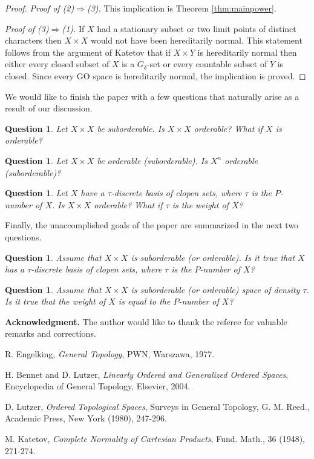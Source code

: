 \documentclass[12pt]{amsart}
\newtheorem{que}[thm]{Question}
\begin{document}
\begin{proof}
\par\bigskip\noindent
{\it Proof of (2)$\Rightarrow$(3).} This implication is Theorem \ref{thm:mainpower}.

\par\bigskip\noindent
{\it Proof of (3)$\Rightarrow$(1).}  If $X$ had a stationary subset or  two limit points of distinct characters then $X\times X$ would not have been hereditarily normal. This statement follows from the argument of Katetov \cite{Kat} that if $X\times Y$ is hereditarily normal then either  every closed subset of $X$ is a $G_\delta$-set or every countable subset of $Y$ is closed. Since every GO space is hereditarily normal, the implication is proved.
\end{proof}
\par\bigskip
We would like to finish the paper with a few questions that naturally arise as a result of our discussion.
\par\bigskip\noindent
\begin{que}
Let $X\times X$ be suborderable. Is $X\times X$ orderable? What if $X$ is orderable?
\end{que}
\begin{que}
Let $X\times X$ be orderable (suborderable). Is $X^n$ orderable (suborderable)?
\end{que}
\begin{que}
Let $X$ have a $\tau$-discrete basis of clopen sets, where $\tau$ is the $P$-number of $X$. Is $X\times X$ orderable?
What if $\tau$ is the weight of $X$?
\end{que}
\par\bigskip\noindent
Finally, the unaccomplished goals of the paper are summarized in the next two questions.
\begin{que}
Assume that $X\times X$ is suborderable (or orderable). Is it true that $X$ has a $\tau$-discrete basis of clopen sets, where $\tau$ is the $P$-number of $X$?
\end{que}
\begin{que}
Assume that $X\times X$ is suborderable (or orderable) space of density $\tau$.  Is it true that the weight of $X$ is equal to the $P$-number of $X$?
\end{que}

\par\bigskip\noindent
{\bf Acknowledgment.} The author would like to thank the referee for valuable remarks and corrections.

\begin{thebibliography}{99}

R. Engelking, {\it General Topology}, PWN, Warszawa, 1977.

H. Bennet and D. Lutzer, {\it Linearly Ordered and Generalized Ordered Spaces}, Encyclopedia of General Topology, Elsevier, 2004.

D. Lutzer, {\it Ordered Topological Spaces}, Surveys in General Topology, G. M. Reed., Academic Press, New York (1980), 247-296.

M. Katetov, {\it Complete Normality of Cartesian Products}, Fund. Math., 36 (1948), 271-274.

\end{thebibliography}
\end{document}
